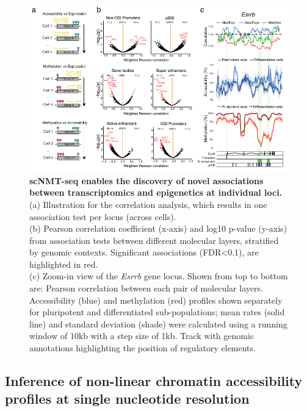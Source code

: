 \begin{figure}[H]
	\centering
	\includegraphics[width=1.0\linewidth]{scNMT_EB_correlations}
	\caption[]{
	\textbf{scNMT-seq enables the discovery of novel associations between transcriptomics and epigenetics at individual loci.}\\ 
	(a) Illustration for the correlation analysis, which results in one association test per locus (across cells). \\
	(b) Pearson correlation coefficient (x-axis) and log10 p-value (y-axis) from association tests between different molecular layers, stratified by genomic contexts. Significant associations (FDR<0.1), are highlighted in red.\\
	(c) Zoom-in view of the \textit{Esrrb} gene locus. Shown from top to bottom are: Pearson correlation between each pair of molecular layers. Accessibility (blue) and methylation (red) profiles shown separately for pluripotent and differentiated sub-populations; mean rates (solid line) and standard deviation (shade) were calculated using a running window of 10kb with a step size of 1kb. Track with genomic annotations highlighting the position of regulatory elements.
	}
	\label{fig:scnmt_eb_correlations}
\end{figure}


\subsection{Inference of non-linear chromatin accessibility profiles at single nucleotide resolution}

